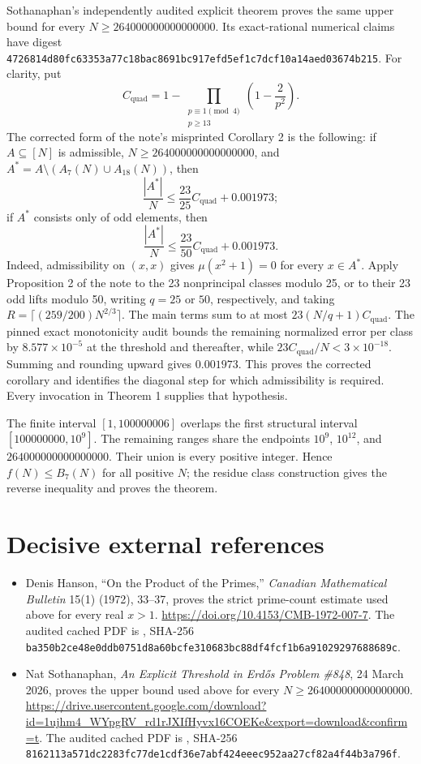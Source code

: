 \documentclass[11pt]{article}
\newcommand{\Bseven}{B_7}
\newcommand{\sha}[1]{\texttt{\nolinkurl{#1}}}
\begin{document}
Sothanaphan's independently audited explicit theorem proves the same upper
bound for every $N\ge264000000000000000$.  Its exact-rational numerical
claims have digest
\sha{4726814d80fc63353a77c18bac8691bc917efd5ef1c7dcf10a14aed03674b215}.
For clarity, put
\[
C_{\mathrm{quad}}=1-
 \prod_{\substack{p\equiv1\pmod4\\p\ge13}}
 \left(1-\frac2{p^2}\right).
\]
The corrected form of the note's misprinted Corollary 2 is the following:
if $A\subseteq[N]$ is admissible, $N\ge264000000000000000$, and
$A^*=A\setminus(A_7(N)\cup A_{18}(N))$, then
\[
 \frac{|A^*|}{N}\le\frac{23}{25}C_{\mathrm{quad}}+0.001973;
\]
if $A^*$ consists only of odd elements, then
\[
 \frac{|A^*|}{N}\le\frac{23}{50}C_{\mathrm{quad}}+0.001973.
\]
Indeed, admissibility on $(x,x)$ gives $\mu(x^2+1)=0$ for every
$x\in A^*$.  Apply Proposition 2 of the note to the 23 nonprincipal
classes modulo 25, or to their 23 odd lifts modulo 50, writing $q=25$ or
$50$, respectively, and taking $R=\lceil(259/200)N^{2/3}\rceil$.  The main terms sum to at most
$23(N/q+1)C_{\mathrm{quad}}$.  The pinned exact monotonicity audit bounds
the remaining normalized error per class by $8.577\times10^{-5}$ at the
threshold and thereafter, while
$23C_{\mathrm{quad}}/N<3\times10^{-18}$.  Summing and rounding upward gives
$0.001973$.  This proves the corrected corollary and identifies the diagonal
step for which admissibility is required.  Every invocation in Theorem 1
supplies that hypothesis.

The finite interval $[1,100000006]$ overlaps the first structural interval
$[100000000,10^9]$.  The remaining ranges share the endpoints $10^9$,
$10^{12}$, and $264000000000000000$.  Their union is every positive
integer.  Hence $f(N)\le\Bseven(N)$ for all positive $N$; the residue
class construction gives the reverse inequality and proves the theorem.

\section*{Decisive external references}

\begin{itemize}
\item Denis Hanson, ``On the Product of the Primes,'' \emph{Canadian
Mathematical Bulletin} 15(1) (1972), 33--37, proves the strict prime-count
estimate used above for every real $x>1$.
\url{https://doi.org/10.4153/CMB-1972-007-7}.  The audited cached PDF is
, SHA-256
\sha{ba350b2ce48e0ddb0751d8a60bcfe310683bc88df4fcf1b6a91029297688689c}.
\item Nat Sothanaphan, \emph{An Explicit Threshold in Erd\H{o}s Problem
\#848}, 24 March 2026, proves the upper bound used above for every
$N\ge264000000000000000$.
\url{https://drive.usercontent.google.com/download?id=1ujhm4_WYpgRV_rd1rJXIfHyvx16COEKe\&export=download\&confirm=t}.
The audited cached PDF is
, SHA-256
\sha{8162113a571dc2283fc77de1cdf36e7abf424eeec952aa27cf82a4f44b3a796f}.
\end{itemize}
\end{document}
